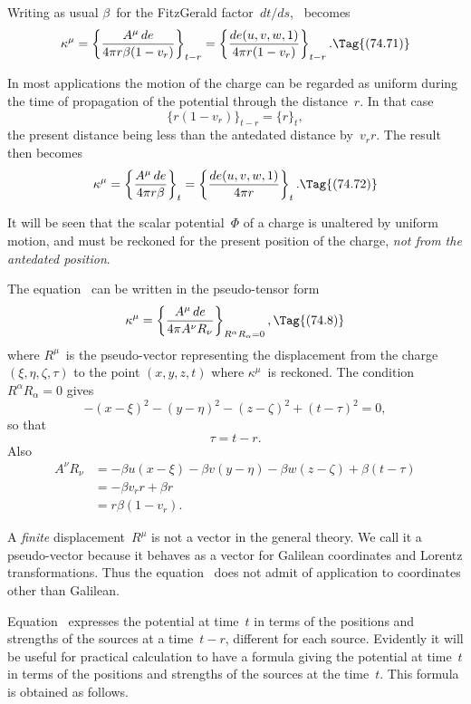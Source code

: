 \documentclass[12pt]{book}
\begin{document}
Writing as usual $\beta$~for the FitzGerald factor~$dt/ds$, ~becomes
\[
\kappa^{\mu} = \left\{\frac{A^{\mu}\, de}{4\pi r\beta(1 - v_{r})}\right\}_{t-r}
= \left\{\frac{de(u, v, w, 1)}{4\pi r(1 - v_{r})}\right\}_{t-r}.
\Tag{(74.71)}
\]

In most applications the motion of the charge can be regarded as uniform
during the time of propagation of the potential through the distance~$r$. In
that case
\[
\{r(1 - v_{r})\}_{t-r} = \{r\}_{t},
\]
the present distance being less than the antedated distance by~$v_{r} r$. The result
then becomes
\[
\kappa^{\mu} = \left\{\frac{A^{\mu}\, de}{4\pi r\beta}\right\}_{t}
= \left\{\frac{de(u, v, w, 1)}{4\pi r}\right\}_{t}.
\Tag{(74.72)}
\]

It will be seen that the scalar potential~$\Phi$ of a charge is unaltered by
uniform motion, and must be reckoned for the present position of the charge,
\emph{not from the antedated position}.

The equation~ can be written in the pseudo\hyp{}tensor form
\[
\kappa^{\mu} = \left\{\frac{A^{\mu}\, de}{4\pi A^{\nu}R_{\nu}}\right\}_{R^{\alpha}R_{\alpha}=0},
\Tag{(74.8)}
\]
where $R^{\mu}$~is the pseudo\hyp{}vector representing the displacement from the charge
%
$(\xi, \eta, \zeta, \tau)$ to the point $(x, y, z, t)$ where $\kappa^{\mu}$~is reckoned. The condition
$R^{\alpha}R_{\alpha} = 0$ gives
\[
-(x - \xi)^{2} - (y - \eta)^{2} - (z - \zeta)^{2} + (t - \tau)^{2} = 0,
\]
so that
\[
\tau = t - r.
\]
Also
\begin{align*}
  A^{\nu} R_{\nu}
  &= -\beta u(x - \xi) - \beta v(y - \eta) - \beta w(z - \zeta) + \beta(t - \tau) \\
  &= -\beta v_{r} r + \beta r \\
  &= r\beta(1 - v_{r}).
\end{align*}

A \emph{finite} displacement~$R^{\mu}$ is not a vector in the general theory. We call it
a pseudo\hyp{}vector because it behaves as a vector for Galilean coordinates and
Lorentz transformations. Thus the equation~ does not admit of application
to coordinates other than Galilean.

Equation~ expresses the potential at time~$t$ in terms of the positions and strengths of the sources
at a time~$t-r$, different for each source.
Evidently it will be useful for practical calculation to have a formula giving the potential at time~$t$ in terms
of the positions and strengths of the sources at the time~$t$.
This formula is obtained as follows.
\end{document}
